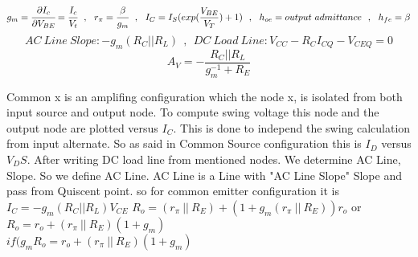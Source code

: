 $$ g_m = \cfrac{\partial I_c}{\partial V_{BE}} = \cfrac{I_c}{V_t} ~~,~~ r_\pi = \cfrac{\beta}{g_m} ~~ , ~~ I_C = I_S ( exp (\dfrac{V_{BE}}{V_T}) + 1)~~ , ~~ h_{oe} = output~admittance ~~ , ~~ h_{fe} = \beta $$
$$AC~Line~Slope:  -g_m ( R_C || R_L )  ~~ , ~~ DC~Load~Line :  V_{CC} - R_C I_{CQ} - V_{CEQ} = 0 $$
$$ A_V = -\dfrac{R_C || R_L}{g_m^{-1} + R_E} $$
\setlength{\parindent}{0.5cm} %
\par
Common x is an amplifing configuration which the node x, is isolated from both input source and output node. To compute swing voltage this node and the output node are plotted versus $I_C$. This is done to independ the swing calculation from input alternate. So as said in Common Source configuration this is $I_D$ versus $V_DS$. After writing DC load line from mentioned nodes. We determine AC Line, Slope. So we define AC Line. AC Line is a Line with "AC Line Slope" Slope and pass from Quiscent point. so for common emitter configuration it is $ I_C = - g_m ( R_C || R_L ) V_{CE} $
\lipsum[1-2]
\setlength{\parindent}{0.0cm} 
$ R_o = (r_\pi ~||~ R_E) + ( 1 + g_m (r_\pi ~||~ R_E) )r_o$ or \\
$ R_o = r_o + (r_\pi ~||~ R_E)( 1 + g_m  )$ \\
$ if ( g_m R_o = r_o + (r_\pi ~||~ R_E)( 1 + g_m  )$ \\
\begin{minipage}[t]{.5\textwidth}
\\
\end{minipage}%
\noindent
\setlength{\parindent}{0.0cm} 
\hspace*{-\parindent}%
\begin{minipage}[b]{.5\textwidth}
\raggedleft

\end{minipage}%
